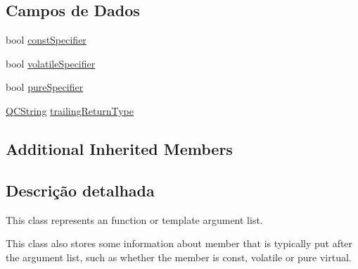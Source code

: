 \subsection*{Campos de Dados}
\begin{DoxyCompactItemize}
\item 
bool \hyperlink{class_argument_list_a9ab1475bcbf4f17b50c7b5a3110743db}{const\-Specifier}
\item 
bool \hyperlink{class_argument_list_a7d6765f3c1ff9ee13a05a1eabbefc965}{volatile\-Specifier}
\item 
bool \hyperlink{class_argument_list_a7606644da45fc7bbd695bad212ede6af}{pure\-Specifier}
\item 
\hyperlink{class_q_c_string}{Q\-C\-String} \hyperlink{class_argument_list_ac2cd23d5da83b9f380f0e0a69bcace02}{trailing\-Return\-Type}
\end{DoxyCompactItemize}
\subsection*{Additional Inherited Members}


\subsection{Descrição detalhada}
This class represents an function or template argument list. 

This class also stores some information about member that is typically put after the argument list, such as whether the member is const, volatile or pure virtual. 

